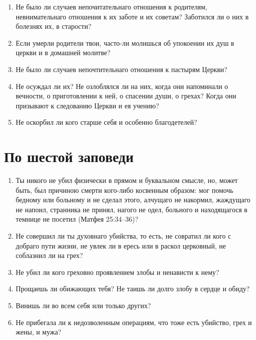 \begin{mymulticols}

\begin{enumerate}

\item Не было ли случаев непочитательнаго отношения к родителям, невнимательнаго отношения к их заботе и их советам? Заботился ли о них в болезнях их, в старости?

\item Если умерли родители твои, часто-ли молишься об упокоении их душ в церкви и в домашней молитве?

\item Не было ли случаев непочтительнаго отношения к пастырям Церкви?

\item Не осуждал ли их? Не озлоблялся ли на них, когда они напоминали о вечности, о приготовлении к ней, о спасении души, о грехах? Когда они призывают к следованию Церкви и ея учению?

\item Не оскорбил ли кого старше себя и особенно благодетелей? 
\end{enumerate}

\end{mymulticols}

\section{По шестой заповеди}\nopagebreak

\begin{mymulticols}

\begin{enumerate}

\item Ты никого не убил физически в прямом и буквальном смысле, но, может быть, был причиною смерти кого-либо косвенным образом: мог помочь бедному или больному и не сделал этого, алчущаго не накормил, жаждущаго не напоил, странника не принял, нагого не одел, больного и находящагося в темнице не посетил (Матфея 25:34--36)?

\item Не совершил ли ты духовнаго убийства, то есть, не совратил ли кого с добраго пути жизни, не увлек ли в ересь или в раскол церковный, не соблазнил ли на грех?

\item Не убил ли кого греховно проявлением злобы и ненависти к нему?

\item Прощаешь ли обижающих тебя? Не таишь ли долго злобу в сердце и обиду?

\item Винишь ли во всем себя или только других?

\item Не прибегала ли к недозволенным операциям, что тоже есть убийство, грех и жены, и мужа? 
\end{enumerate}

\end{mymulticols}

